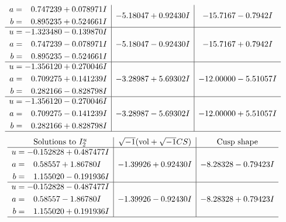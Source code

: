 \documentclass[1p]{elsarticle_modified}
\theoremstyle{definition}
\newcommand{\I}{\sqrt{-1}}
\begin{document}
$$\begin{array}{c|c|c}
\begin{aligned}
a &= \phantom{-}0.747239 + 0.078971 I \\
b &= \phantom{-}0.895235 + 0.524661 I\end{aligned}
 & -5.18047 + 0.92430 I & -15.7167 - 0.7942 I \\ \hline\begin{aligned}
u &= -1.323480 - 0.139870 I \\
a &= \phantom{-}0.747239 - 0.078971 I \\
b &= \phantom{-}0.895235 - 0.524661 I\end{aligned}
 & -5.18047 - 0.92430 I & -15.7167 + 0.7942 I \\ \hline\begin{aligned}
u &= -1.356120 + 0.270046 I \\
a &= \phantom{-}0.709275 + 0.141239 I \\
b &= \phantom{-}0.282166 - 0.828798 I\end{aligned}
 & -3.28987 + 5.69302 I & -12.00000 - 5.51057 I \\ \hline\begin{aligned}
u &= -1.356120 - 0.270046 I \\
a &= \phantom{-}0.709275 - 0.141239 I \\
b &= \phantom{-}0.282166 + 0.828798 I\end{aligned}
 & -3.28987 - 5.69302 I & -12.00000 + 5.51057 I\\
 \hline 
 \end{array}$$\newpage$$\begin{array}{c|c|c}  
\text{Solutions to }I^u_{2}& \I (\text{vol} + \sqrt{-1}CS) & \text{Cusp shape}\\
 \hline 
\begin{aligned}
u &= -0.152828 + 0.487477 I \\
a &= \phantom{-}0.58557 + 1.86780 I \\
b &= \phantom{-}1.155020 - 0.191936 I\end{aligned}
 & -1.39926 + 0.92430 I & -8.28328 - 0.79423 I \\ \hline\begin{aligned}
u &= -0.152828 - 0.487477 I \\
a &= \phantom{-}0.58557 - 1.86780 I \\
b &= \phantom{-}1.155020 + 0.191936 I\end{aligned}
 & -1.39926 - 0.92430 I & -8.28328 + 0.79423 I\\
 \hline 
 \end{array}$$\newpage\newpage\renewcommand{\arraystretch}{1}
\end{document}
